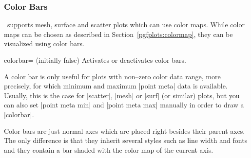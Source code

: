 \subsubsection{Color Bars}
\label{pgfplots:colorbar}
\PGFPlots\ supports mesh, surface and scatter plots which can use color maps. While color maps can be chosen as described in Section~\ref{pgfplots:colormap}, they can be visualized using color bars.

\begin{pgfplotskey}{colorbar= (initially false)}
	Activates or deactivates color bars.

\begin{codeexample}[]
\end{codeexample}

\begin{codeexample}[]
\end{codeexample}

\begin{codeexample}[]
\end{codeexample}
	
	A color bar is only useful for plots with non--zero color data range, more precisely, for which minimum and maximum |point meta| data is available. Usually, this is the case for |scatter|, |mesh| or |surf| (or similar) plots, but you can also set |point meta min| and |point meta max| manually in order to draw a |colorbar|. 
	
	Color bars are just normal axes which are placed right besides their parent axes. The only difference is that they inherit several styles such as line width and fonts and they contain a bar shaded with the color map of the current axis.
	

\end{pgfplotskey}
